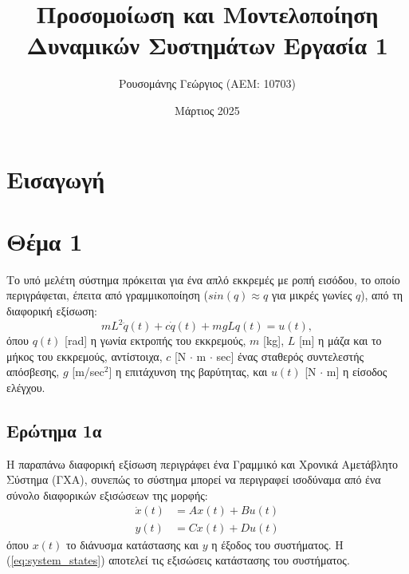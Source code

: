 \documentclass[a4paper,12pt]{article}
\title{Προσομοίωση και Μοντελοποίηση \newline Δυναμικών Συστημάτων \newline Εργασία 1}
\author{Ρουσομάνης Γεώργιος (ΑΕΜ: 10703)}
\date{Μάρτιος 2025}
\begin{document}
\maketitle

\section*{Εισαγωγή}


\section*{Θέμα 1}
Το υπό μελέτη σύστημα πρόκειται για ένα απλό εκκρεμές με ροπή εισόδου, το οποίο περιγράφεται, έπειτα από γραμμικοποίηση ($sin(q) \approx q$ για μικρές γωνίες $q$), από τη διαφορική εξίσωση:
\begin{equation}
    mL^2\ddot{q}(t) + c\dot{q}(t) + mgLq(t) = u(t),
    \label{eq:system_differential_equation}
\end{equation}
όπου $q(t)$ [rad] η γωνία εκτροπής του εκκρεμούς, 
$m$ [kg], $L$ [m] 
η μάζα και το μήκος του εκκρεμούς, αντίστοιχα, $c$ [N $\cdot$ m $\cdot$ sec] 
ένας σταθερός συντελεστής απόσβεσης, $g$ [m/sec$^2$] η
επιτάχυνση της βαρύτητας, και $u(t)$ [N $\cdot$ m] η είσοδος ελέγχου.

\subsection*{Ερώτημα 1α}
Η παραπάνω διαφορική εξίσωση περιγράφει ένα Γραμμικό και Χρονικά Αμετάβλητο Σύστημα (ΓΧΑ), συνεπώς το σύστημα μπορεί
να περιγραφεί ισοδύναμα από ένα σύνολο διαφορικών εξισώσεων της μορφής:
\begin{equation}
\begin{aligned}
    \dot{x}(t) &= A x(t) + B u(t) \\
    y(t) &= C x(t) + D u(t)
\end{aligned}
\label{eq:system_states}
\end{equation}
όπου $x(t)$ το διάνυσμα κατάστασης και $y$ η έξοδος του συστήματος. Η (\ref{eq:system_states}) αποτελεί τις εξισώσεις
κατάστασης του συστήματος. 
\end{document}
